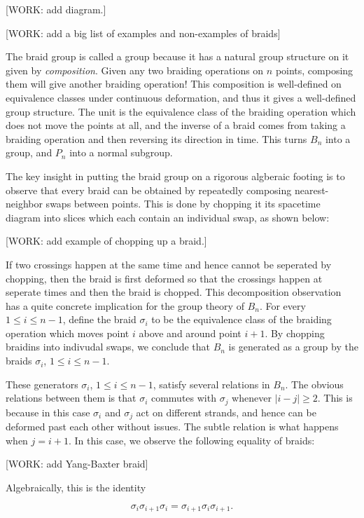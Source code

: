 [WORK: add diagram.]

[WORK: add a big list of examples and non-examples of braids]

The braid group is called a group because it has a natural group structure on it given by \textit{composition}. Given any two braiding operations on $n$ points, composing them will give another braiding operation! This composition is well-defined on equivalence classes under continuous deformation, and thus it gives a well-defined group structure. The unit is the equivalence class of the braiding operation which does not move the points at all, and the inverse of a braid comes from taking a braiding operation and then reversing its direction in time. This turns $B_n$ into a group, and $P_n$ into a normal subgroup.

The key insight in putting the braid group on a rigorous algberaic footing is to observe that every braid can be obtained by repeatedly composing nearest-neighbor swaps between points. This is done by chopping it its spacetime diagram into slices which each contain an individual swap, as shown below:

[WORK: add example of chopping up a braid.]

If two crossings happen at the same time and hence cannot be seperated by chopping, then the braid is first deformed so that the crossings happen at seperate times and then the braid is chopped. This decomposition observation has a quite concrete implication for the group theory of $B_n$. For every $1\leq i\leq n-1$, define the braid $\sigma_{i}$ to be the equivalence class of the braiding operation which moves point $i$ above and around point $i+1$. By chopping braidins into indivudal swaps, we conclude that $B_n$ is generated as a group by the braids $\sigma_i$, $1\leq i\leq n-1$.

These generators $\sigma_i$, $1\leq i\leq n-1$, satisfy several relations in $B_n$. The obvious relations between them is that $\sigma_i$ commutes with $\sigma_j$ whenever $|i-j|\geq 2$. This is because in this case $\sigma_i$ and $\sigma_j$ act on different strands, and hence can be deformed past each other without issues. The subtle relation is what happens when $j=i+1$. In this case, we observe the following equality of braids:

[WORK: add Yang-Baxter braid]

Algebraically, this is the identity

$$\sigma_{i}\sigma_{i+1}\sigma_{i}=\sigma_{i+1}\sigma_{i}\sigma_{i+1}.$$

